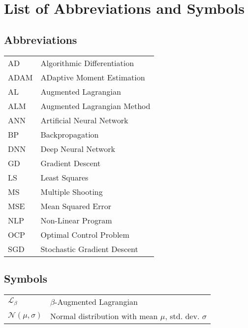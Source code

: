 \documentclass[master=wit,english]{kulemt}
\begin{document}
\chapter{List of Abbreviations and Symbols}
\section*{Abbreviations}
\begin{flushleft}
  \renewcommand{\arraystretch}{1.1}
  \begin{tabularx}{\textwidth}{@{}p{12mm}X@{}}
  	AD & Algorithmic Differentiation \\
  	ADAM & ADaptive Moment Estimation \\
  	AL & Augmented Lagrangian \\
  	ALM & Augmented Lagrangian Method \\
  	ANN & Artificial Neural Network \\
  	BP & Backpropagation \\
  	DNN & Deep Neural Network \\
  	GD & Gradient Descent \\
  	LS & Least Squares \\
  	MS & Multiple Shooting \\
  	MSE & Mean Squared Error \\
  	NLP & Non-Linear Program \\
  	OCP & Optimal Control Problem \\
  	SGD & Stochastic Gradient Descent \\ 
  \end{tabularx}
\end{flushleft}
\section*{Symbols}
\begin{flushleft}
  \renewcommand{\arraystretch}{1.1}
  \begin{tabularx}{\textwidth}{@{}p{12mm}X@{}}
    $\mathcal{L}_{\beta}$   & $\beta$-Augmented Lagrangian \\
    $\mathcal{N}(\mu,\sigma)$ & Normal distribution with mean $\mu$, std. dev. $\sigma$
  \end{tabularx}
\end{flushleft}

\mainmatter








\appendixpage*          %
\appendix




\backmatter


\end{document}
